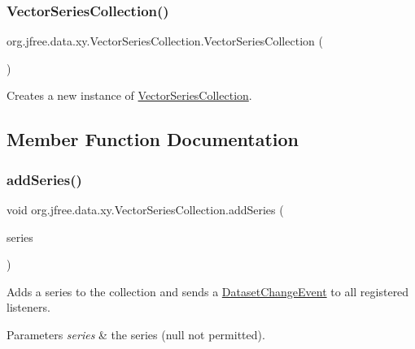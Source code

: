 \subsubsection{\texorpdfstring{Vector\+Series\+Collection()}{VectorSeriesCollection()}}
{\footnotesize\ttfamily org.\+jfree.\+data.\+xy.\+Vector\+Series\+Collection.\+Vector\+Series\+Collection (\begin{DoxyParamCaption}{ }\end{DoxyParamCaption})}

Creates a new instance of {\ttfamily \mbox{\hyperlink{classorg_1_1jfree_1_1data_1_1xy_1_1_vector_series_collection}{Vector\+Series\+Collection}}}. 

\subsection{Member Function Documentation}
\mbox{\label{classorg_1_1jfree_1_1data_1_1xy_1_1_vector_series_collection_a3e60d6c169801c98f51b68780fb70844}} 
\subsubsection{\texorpdfstring{add\+Series()}{addSeries()}}
{\footnotesize\ttfamily void org.\+jfree.\+data.\+xy.\+Vector\+Series\+Collection.\+add\+Series (\begin{DoxyParamCaption}\item[{\mbox{\hyperlink{classorg_1_1jfree_1_1data_1_1xy_1_1_vector_series}{Vector\+Series}}}]{series }\end{DoxyParamCaption})}

Adds a series to the collection and sends a \mbox{\hyperlink{}{Dataset\+Change\+Event}} to all registered listeners.


\begin{DoxyParams}{Parameters}
{\em series} & the series ({\ttfamily null} not permitted). \\
\hline
\end{DoxyParams}
\mbox{\label{classorg_1_1jfree_1_1data_1_1xy_1_1_vector_series_collection_a293406705f9600ee21a357c1c6242b34}} 
